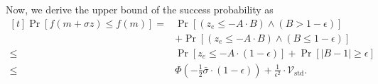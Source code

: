 \documentclass[journal]{IEEEtran}
\providecommand{\E}{\mathbb{E}} %
\renewcommand{\geq}{\geqslant} %
\renewcommand{\leq}{\leqslant} %
\theoremstyle{definition}
\begin{document}
Now, we derive the upper bound of the success probability as
\begin{equation}
\begin{aligned}[t]
\Pr\left[f(m + \sigma z) \leq f(m) \right]
=&
\Pr\left[ \left(z_e \leq - A \cdot B\right)\wedge \left( B > 1-\epsilon\right)\right]
\\
&+\Pr\left[ \left(z_e \leq - A \cdot B\right)\wedge\left(B \leq 1-\epsilon\right)\right]
\\
\leq&
\Pr\left[ z_e \leq - A \cdot(1-\epsilon)\right]
+\Pr\left[ \left| B -1 \right| \geq \epsilon\right]
\\
\leq&
\Phi\left( - \frac12 \bar\sigma\cdot(1-\epsilon)\right)
+ \frac{1}{\epsilon^2} \cdot \mathcal{V}_\mathrm{std}
.
\end{aligned}
\end{equation}
\end{document}
